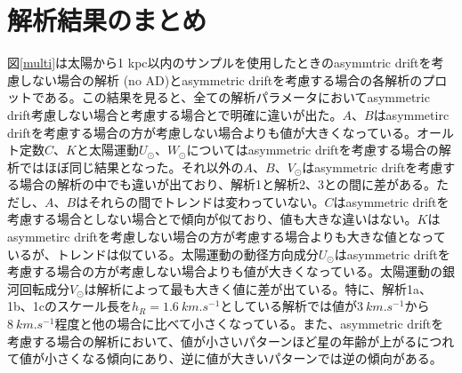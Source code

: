 
\section{解析結果のまとめ}
図\ref{multi}は太陽から1 kpc以内のサンプルを使用したときのasymmtric driftを考慮しない場合の解析 (no AD)とasymmetric driftを考慮する場合の各解析のプロットである。この結果を見ると、全ての解析パラメータにおいてasymmetric drift考慮しない場合と考慮する場合とで明確に違いが出た。$A、B$はasymmetirc driftを考慮する場合の方が考慮しない場合よりも値が大きくなっている。オールト定数$C、K$と太陽運動$U_{\odot}、W_{\odot}$についてはasymmetric driftを考慮する場合の解析ではほぼ同じ結果となった。それ以外の$A、B、V_{\odot}$はasymmetric driftを考慮する場合の解析の中でも違いが出ており、解析1と解析2、3との間に差がある。ただし、$A、B$はそれらの間でトレンドは変わっていない。$C$はasymmetric driftを考慮する場合としない場合とで傾向が似ており、値も大きな違いはない。$K$はasymmetirc driftを考慮しない場合の方が考慮する場合よりも大きな値となっているが、トレンドは似ている。太陽運動の動径方向成分$U_{\odot}$はasymmetric driftを考慮する場合の方が考慮しない場合よりも値が大きくなっている。太陽運動の銀河回転成分$V_{\odot}$は解析によって最も大きく値に差が出ている。特に、解析1a、1b、1cのスケール長を$h_R=\SI{1.6}{km.s^{-1}}$としている解析では値が$\SI{3}{km.s^{-1}}$から$\SI{8}{km.s^{-1}}$程度と他の場合に比べて小さくなっている。また、asymmetric driftを考慮する場合の解析において、値が小さいパターンほど星の年齢が上がるにつれて値が小さくなる傾向にあり、逆に値が大きいパターンでは逆の傾向がある。

